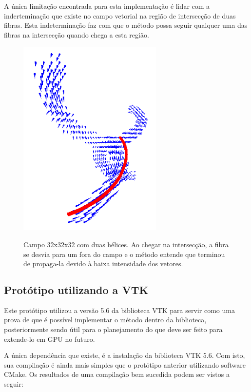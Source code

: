   A única limitação encontrada para esta implementação é lidar com a inderteminação que existe no campo vetorial na região de intersecção de duas fibras. Esta indeterminação faz com que o método possa seguir qualquer uma das fibras na intersecção quando chega a esta região.
  
  \begin{figure}[!h]
    \begin{center}
      \includegraphics[width=72mm, height=100mm]{images/fibraecampo.png}
      \label{fig:fibraecampo}
      \caption{Campo 32x32x32 com duas hélices. Ao chegar na intersecção, a fibra se desvia para um fora do campo e o método entende que terminou de propaga-la devido à baixa intensidade dos vetores.}
    \end{center}
  \end{figure}
  
  \newpage
  \subsection{Protótipo utilizando a VTK}
  Este protótipo utilizou a versão 5.6 da biblioteca VTK para servir como uma prova de que é possível implementar o método dentro da biblioteca, posteriormente sendo útil para o planejamento do que deve ser feito para extende-lo em GPU no futuro.
  
  A única dependência que existe, é a instalação da biblioteca VTK 5.6. Com isto, sua compilação é ainda mais simples que o protótipo anterior utilizando software CMake. Os resultados de uma compilação bem sucedida podem ser vistos a seguir:
  
